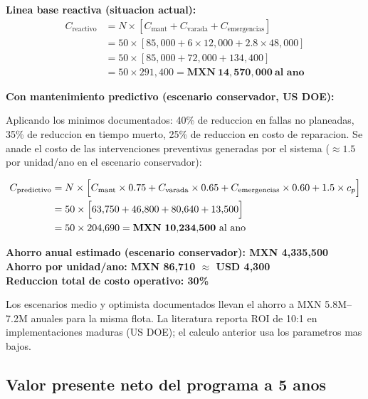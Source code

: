 \documentclass[10.5pt,a4paper]{article}
\begin{document}
\medskip
\textbf{Linea base reactiva (situacion actual):}
\begin{align*}
C_{\mathrm{reactivo}} &= N \times \left[C_{\mathrm{mant}} + C_{\mathrm{varada}} + C_{\mathrm{emergencias}}\right] \\
  &= 50 \times \left[85{,}000 + 6 \times 12{,}000 + 2.8 \times 48{,}000\right] \\
  &= 50 \times \left[85{,}000 + 72{,}000 + 134{,}400\right] \\
  &= 50 \times 291{,}400 = \mathbf{MXN~14{,}570{,}000~\text{al ano}}
\end{align*}

\textbf{Con mantenimiento predictivo (escenario conservador, US DOE):}

Aplicando los minimos documentados: 40\% de reduccion en fallas no planeadas,
35\% de reduccion en tiempo muerto, 25\% de reduccion en costo de reparacion.
Se anade el costo de las intervenciones preventivas generadas por el sistema
($\approx 1.5$ por unidad/ano en el escenario conservador):

\begin{align*}
C_{\mathrm{predictivo}} &= N \times \Bigl[
    C_{\mathrm{mant}} \times 0.75
  + C_{\mathrm{varada}} \times 0.65
  + C_{\mathrm{emergencias}} \times 0.60
  + 1.5 \times c_p \Bigr] \\
  &= 50 \times \Bigl[63{,}750 + 46{,}800 + 80{,}640 + 13{,}500\Bigr] \\
  &= 50 \times 204{,}690 = \mathbf{MXN~10{,}234{,}500~\text{al ano}}
\end{align*}

\medskip
\begin{greenbox}
\begin{center}
\textbf{Ahorro anual estimado (escenario conservador): MXN 4{,}335{,}500}\\[4pt]
\textbf{Ahorro por unidad/ano: MXN 86{,}710 \;$\approx$\; USD 4{,}300}\\[4pt]
\textbf{Reduccion total de costo operativo: 30\%}
\end{center}
\vspace{2pt}
{\small Los escenarios medio y optimista documentados llevan el ahorro a MXN 5.8M--7.2M anuales
para la misma flota. La literatura reporta ROI de 10:1 en implementaciones maduras
(US DOE); el calculo anterior usa los parametros mas bajos.}
\end{greenbox}

\subsection{Valor presente neto del programa a 5 anos}
\end{document}
